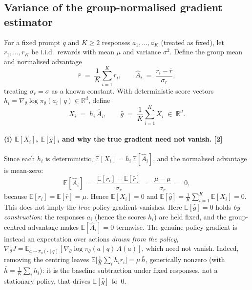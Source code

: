 \documentclass[11pt,a4paper]{article}
\begin{document}
\subsection{Variance of the group-normalised gradient estimator}
\label{sec:theory-q1}
For a fixed prompt $q$ and $K\ge 2$ responses $a_1,\dots,a_K$ (treated as fixed),
let $r_1,\dots,r_K$ be i.i.d.\ rewards with mean $\mu$ and variance $\sigma^2$.
Define the group mean and normalised advantage
\begin{equation}
  \bar r \;=\; \frac{1}{K}\sum_{i=1}^{K} r_i,
  \qquad
  \hat A_i \;=\; \frac{r_i-\bar r}{\sigma_r},
  \label{eq:q1-adv}
\end{equation}
treating $\sigma_r=\sigma$ as a known constant. With deterministic score vectors
$h_i=\nabla_\theta\log\pi_\theta(a_i\mid q)\in\mathbb{R}^d$, define
\begin{equation}
  X_i \;=\; h_i\,\hat A_i,
  \qquad
  \hat g \;=\; \frac{1}{K}\sum_{i=1}^{K} X_i \;\in\; \mathbb{R}^d.
  \label{eq:q1-ghat}
\end{equation}

\paragraph{(i) $\mathbb{E}[X_i]$, $\mathbb{E}[\hat g]$, and why the true gradient need not vanish. \hfill\textnormal{[2]}}
Since each $h_i$ is deterministic, $\mathbb{E}[X_i]=h_i\,\mathbb{E}[\hat A_i]$, and the
normalised advantage is mean-zero:
\begin{equation}
  \mathbb{E}[\hat A_i]
  \;=\; \frac{\mathbb{E}[r_i]-\mathbb{E}[\bar r]}{\sigma_r}
  \;=\; \frac{\mu-\mu}{\sigma_r}
  \;=\; 0 ,
  \label{eq:q1-meanzero}
\end{equation}
because $\mathbb{E}[r_i]=\mathbb{E}[\bar r]=\mu$. Hence $\mathbb{E}[X_i]=0$ and
$\mathbb{E}[\hat g]=\tfrac{1}{K}\sum_{i=1}^{K}\mathbb{E}[X_i]=0$.
This does not imply the \emph{true} policy gradient vanishes. Here $\mathbb{E}[\hat g]=0$ holds
\emph{by construction}: the responses $a_i$ (hence the scores $h_i$) are held fixed, and the
group-centred advantage makes $\mathbb{E}[\hat A_i]=0$ termwise. The genuine policy gradient is
instead an expectation over actions \emph{drawn from the policy},
$\nabla_\theta J=\mathbb{E}_{a\sim\pi_\theta(\cdot\mid q)}[\nabla_\theta\log\pi_\theta(a\mid q)\,A(a)]$,
which need not vanish. Indeed, removing the centring leaves
$\mathbb{E}\bigl[\tfrac{1}{K}\sum_i h_i r_i\bigr]=\mu\,\bar h$, generically nonzero
(with $\bar h=\tfrac{1}{K}\sum_i h_i$): it is the baseline subtraction under fixed responses,
not a stationary policy, that drives $\mathbb{E}[\hat g]$ to~$0$.
\end{document}
